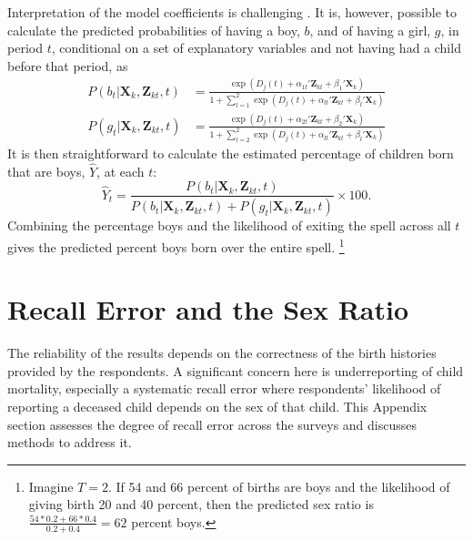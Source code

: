 \documentclass[12pt,letterpaper]{article}
\begin{document}
Interpretation of the model coefficients is challenging \citep{thomas96}.
It is, however, possible to calculate the predicted probabilities of 
having a boy, $b$, and of having a girl, $g$, in period $t$, conditional on 
a set of explanatory variables and not having had a child before that period, as
\begin{align}
P(b_{t} | \mathbf{X}_{k}, \mathbf{Z}_{kt}, t ) 
& =  
\frac{ \exp(D_j(t) + \alpha_{1t}' \mathbf{Z}_{kt} + \beta_1' \mathbf{X}_{k} )}
{1 + \sum_{l=1}^2 \exp(D_j(t) + \alpha_{lt} ' \mathbf{Z}_{kt} + \beta_l ' \mathbf{X}_{k})}
\label{eq:probability_boy} \\
P(g_{t} | \mathbf{X}_{k}, \mathbf{Z}_{kt},t ) 
& =  
\frac{ \exp(D_j(t) + \alpha_{2t}'\mathbf{Z}_{kt} + \beta_2'\mathbf{X}_{k} )}
{1 + \sum_{l=2}^2 \exp(D_j(t) + \alpha_{lt}'\mathbf{Z}_{kt} + \beta_l'\mathbf{X}_{k})}
\label{eq:probability_girl}
\end{align}
It is then straightforward to calculate the estimated percentage of children born that 
are boys, $\hat{Y}$, at each $t$:  
\begin{equation}
\hat{Y}_t 
= 
\frac{ P(b_{t} | \mathbf{X}_{k}, \mathbf{Z}_{kt},t )}
{ P(b_{t} | \mathbf{X}_{k}, \mathbf{Z}_{kt},t) + P(g_{t} | \mathbf{X}_{k}, \mathbf{Z}_{kt},t )} 
\times 100.
\label{eq:probability_son}
\end{equation}
Combining the percentage boys and the likelihood of exiting the spell 
across all $t$ gives the predicted percent boys born over the entire spell.%
\footnote{
Imagine $T=2$. 
If 54 and 66 percent of births are boys and the likelihood of giving birth 20 and 40 percent, 
then the predicted sex ratio is $\frac{54*0.2+66*0.4}{0.2+0.4} = 62$ percent boys. 
}




\clearpage
\newpage

\section{Recall Error and the Sex Ratio}

\setcounter{figure}{0}
\setcounter{table}{0}

The reliability of the results depends on the correctness of the birth histories
provided by the respondents.
A significant concern here is underreporting of child mortality, especially a systematic
recall error where respondents' likelihood of reporting a deceased child depends on the 
sex of that child. 
This Appendix section assesses the degree of recall error across the surveys and discusses 
methods to address it.
\end{document}
